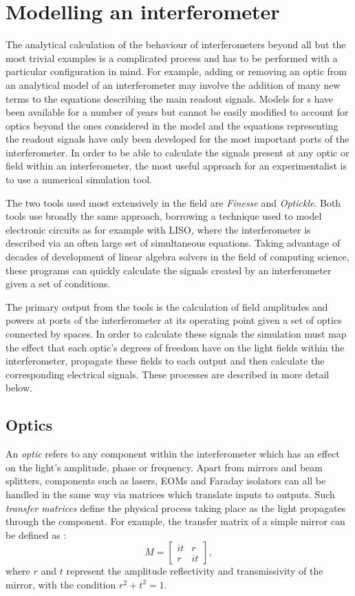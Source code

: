 \section{Modelling an interferometer}
The analytical calculation of the behaviour of interferometers beyond all but the most trivial examples is a complicated process and has to be performed with a particular configuration in mind. For example, adding or removing an optic from an analytical model of an interferometer may involve the addition of many new terms to the equations describing the main readout signals. Models for \DRFPMI{}s have been available for a number of years  but cannot be easily modified to account for optics beyond the ones considered in the model and the equations representing the readout signals have only been developed for the most important ports of the interferometer. In order to be able to calculate the signals present at any optic or field within an interferometer, the most useful approach for an experimentalist is to use a numerical simulation tool.

The two tools used most extensively in the field are \emph{Finesse} and \emph{Optickle}. Both tools use broadly the same approach, borrowing a technique used to model electronic circuits as for example with \gls{LISO}, where the interferometer is described via an often large set of simultaneous equations. Taking advantage of decades of development of linear algebra solvers in the field of computing science, these programs can quickly calculate the signals created by an interferometer given a set of conditions.

The primary output from the tools is the calculation of field amplitudes and powers at ports of the interferometer at its operating point given a set of optics connected by spaces. In order to calculate these signals the simulation must map the effect that each optic's degrees of freedom have on the light fields within the interferometer, propagate these fields to each output and then calculate the corresponding electrical signals. These processes are described in more detail below. 

\subsection{Optics}
An \emph{optic} refers to any component within the interferometer which has an effect on the light's amplitude, phase or frequency. Apart from mirrors and beam splitters, components such as lasers, \glspl{EOM} and Faraday isolators can all be handled in the same way via matrices which translate inputs to outputs. Such \emph{transfer matrices} define the physical process taking place as the light propagates through the component. For example, the transfer matrix of a simple mirror can be defined as \cite{Freise2010}:
\begin{equation}
  M =
  \begin{bmatrix}
    it & r \\
    r & it
  \end{bmatrix},
\end{equation}
where $r$ and $t$ represent the amplitude reflectivity and transmissivity of the mirror, with the condition $r^2 + t^2 = 1$.

